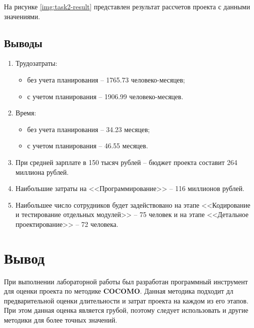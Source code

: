 На рисунке \ref{img:task2-result} представлен результат рассчетов проекта с данными значениями.



\subsection{Выводы}

\begin{enumerate}
    \item Трудозатраты:
        \begin{itemize}
            \item без учета планирования -- 1765.73 человеко-месяцев;
            \item с учетом планирования -- 1906.99 человеко-месяцев.
        \end{itemize}
    \item Время:
        \begin{itemize}
            \item без учета планирования -- 34.23 месяцев;
            \item с учетом планирования -- 46.55 месяцев.
        \end{itemize}
    \item При средней зарплате в 150 тысяч рублей -- бюджет проекта составит 264 миллиона рублей.
    \item Наибольшие затраты на <<Программирование>> -- 116 миллионов рублей.
    \item Наибольшее число сотрудников будет задействовано на этапе <<Кодирование и тестирование отдельных модулей>> -- 75 человек и на этапе <<Детальное проектирование>> -- 72 человека.
\end{enumerate}


\section{Вывод}

При выполнении лабораторной работы был разработан программный инструмент для оценки проекта по методике \textbf{COCOMO}. Данная методика подходит дл предварительной оценки длительности и затрат проекта на каждом из его этапов. При этом данная оценка является грубой, поэтому следует использовать и другие методики для более точных значений.

